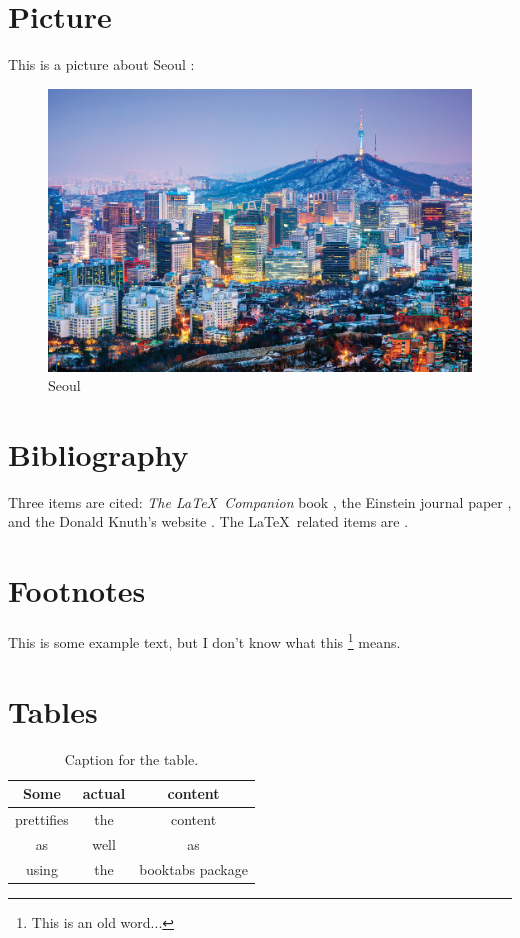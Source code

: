 \documentclass{article}
\begin{document}
\section{Picture}

This is a picture about Seoul :

\begin{figure}
  \includegraphics[width=\linewidth]{seoul.png}
  \caption{Seoul}
  \label{fig:seoul1}
\end{figure}

\section{Bibliography}
Three items are cited: \textit{The \LaTeX\ Companion} book \cite{latexcompanion}, the Einstein
journal paper \cite{einstein}, and the Donald Knuth's website \cite{knuthwebsite}. 
The \LaTeX\ related items are \cite{latexcompanion,knuthwebsite}. 
 
\medskip
 



\section{Footnotes}

This is some example text, but I don't know what this \footnote{\label{myfootnote}This is an old word...} means.

\section{Tables}

\begin{table}[h!]
  \centering
  \caption{Caption for the table.}
  \label{tab:table1}
  \begin{tabular}{ccc}
    \toprule
    Some & actual & content\\
    \midrule
    prettifies & the & content\\
    as & well & as\\
    using & the & booktabs package\\
    \bottomrule
  \end{tabular}
\end{table}
\end{document}
